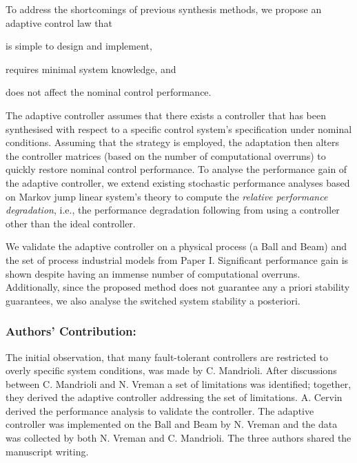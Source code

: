 To address the shortcomings of previous synthesis methods, we propose an adaptive control law that
\begin{enumerate*}[label=(\roman*)]
    \item is simple to design and implement,
    \item requires minimal system knowledge, and
    \item does not affect the nominal control performance.
\end{enumerate*}
The adaptive controller assumes that there exists a controller that has been synthesised with respect to a specific control system's specification under nominal conditions.
Assuming that the \tK{} strategy is employed, the adaptation then alters the controller matrices (based on the number of computational overruns) to quickly restore nominal control performance.
To analyse the performance gain of the adaptive controller, we extend existing stochastic performance analyses based on Markov jump linear system's theory to compute the \emph{relative performance degradation}, i.e., the performance degradation following from using a controller other than the ideal controller.

We validate the adaptive controller on a physical process (a Ball and Beam) and the set of process industrial models from Paper I.
Significant performance gain is shown despite having an immense number of computational overruns.
Additionally, since the proposed method does not guarantee any a priori stability guarantees, we also analyse the switched system stability a posteriori.

\subsubsection*{Authors' Contribution:}%
%
The initial observation, that many fault-tolerant controllers are restricted to overly specific system conditions, was made by C. Mandrioli.
After discussions between C. Mandrioli and N. Vreman a set of limitations was identified; together, they derived the adaptive controller addressing the set of limitations.
A. Cervin derived the performance analysis to validate the controller.
The adaptive controller was implemented on the Ball and Beam by N. Vreman and the data was collected by both N. Vreman and C. Mandrioli.
The three authors shared the manuscript writing.



\clearpage %


